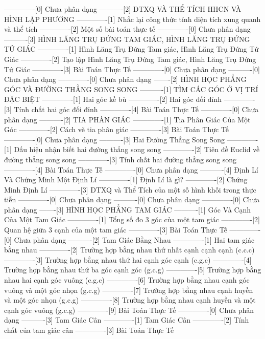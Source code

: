 -------------[0] Chưa phân dạng
----------[2] DTXQ VÀ THỂ TÍCH HHCN VÀ HÌNH LẬP PHƯƠNG
-------------[1] Nhắc lại công thức tính diện tích xung quanh và thể tích
-------------[2] Một số bài toán thực tế
-------------[0] Chưa phân dạng
----------[3] HÌNH LĂNG TRỤ ĐỨNG TAM GIÁC, HÌNH LĂNG TRỤ ĐỨNG TỨ GIÁC
-------------[1] Hình Lăng Trụ Đứng Tam giác, Hình Lăng Trụ Đứng Tứ Giác
-------------[2] Tạo lập Hình Lăng Trụ Đứng Tam giác, Hình Lăng Trụ Đứng Tứ Giác
-------------[3] Bài Toán Thực Tế
-------------[0] Chưa phân dạng
----------[0] Chưa phân dạng
-------------[0] Chưa phân dạng
-------[2] HÌNH HỌC PHẲNG GÓC VÀ ĐƯỜNG THẰNG SONG SONG
----------[1] TÌM CÁC GÓC Ở VỊ TRÍ ĐẶC BIỆT
-------------[1] Hai góc kề bù
-------------[2] Hai góc đối đỉnh
-------------[3] Tính chất hai góc đối đỉnh
-------------[4] Bài Toán Thực Tế
-------------[0] Chưa phân dạng
----------[2] TIA PHÂN GIÁC
-------------[1] Tia Phân Giác Của Một Góc
-------------[2] Cách vẽ tia phân giác
-------------[3] Bài Toán Thực Tế
-------------[0] Chưa phân dạng
----------[3] Hai Đường Thẳng Song Song
-------------[1] Dấu hiệu nhận biết hai đường thẳng song song
-------------[2] Tiên đề Euclid về đường thẳng song song
-------------[3] Tính chất hai đường thẳng song song 
-------------[4] Bài Toán Thực Tế
-------------[0] Chưa phân dạng
----------[4] Định Lí Và Chứng Minh Một Định Lí
-------------[1] Định Lí là gì?
-------------[2] Chứng Minh Định Lí
-------------[3] DTXQ và Thể Tích của một số hình khối trong thực tiễn
-------------[0] Chưa phân dạng
----------[0] Chưa phân dạng
-------------[0] Chưa phân dạng
-------[3] HÌNH HỌC PHẲNG TAM GIÁC
----------[1] Góc Và Cạnh Của Một Tam Giác
-------------[1] Tổng số đo 3 góc của một tam giác
-------------[2] Quan hệ giữa 3 cạnh của một tam giác
-------------[3] Bài Toán Thực Tế
-------------[0] Chưa phân dạng
----------[2] Tam Giác Bằng Nhau
-------------[1] Hai tam giác bằng nhau
-------------[2] Trường hợp bằng nhau thứ nhất cạnh cạnh cạnh (c.c.c)
-------------[3] Trường hợp bằng nhau thứ hai cạnh góc cạnh (c.g.c)
-------------[4] Trường hợp bằng nhau thứ ba góc cạnh góc (g.c.g)
-------------[5] Trường hợp bằng nhau hai cạnh góc vuông (c.g.c)
-------------[6] Trường hợp bằng nhau cạnh góc vuông và một góc nhọn (g.c.g)
-------------[7] Trường hợp bằng nhau cạnh huyền và một góc nhọn (g.c.g)
-------------[8] Trường hợp bằng nhau cạnh huyền và một cạnh góc vuông (g.c.g)
-------------[9] Bài Toán Thực Tế
-------------[0] Chưa phân dạng
----------[3] Tam Giác Cân
-------------[1] Tam Giác Cân
-------------[2] Tính chất của tam giác cân
-------------[3] Bài Toán Thực Tế
